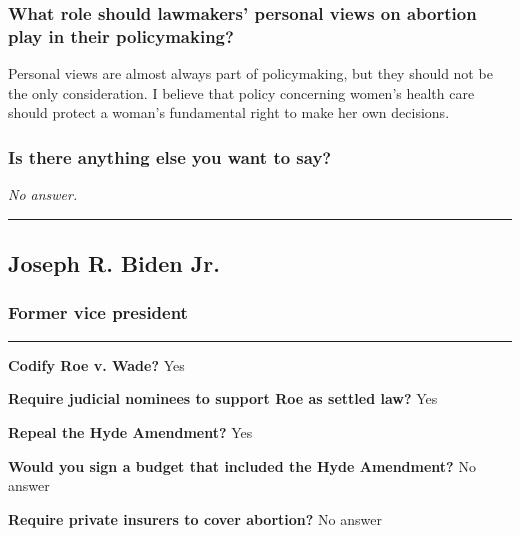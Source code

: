 \hypertarget{what-role-should-lawmakers-personal-views-on-abortion-play-in-their-policymaking}{%
\subsubsection{What role should lawmakers' personal views on abortion
play in their
policymaking?}\label{what-role-should-lawmakers-personal-views-on-abortion-play-in-their-policymaking}}

Personal views are almost always part of policymaking, but they should
not be the only consideration. I believe that policy concerning women's
health care should protect a woman's fundamental right to make her own
decisions.

\hypertarget{is-there-anything-else-you-want-to-say}{%
\subsubsection{Is there anything else you want to
say?}\label{is-there-anything-else-you-want-to-say}}

\emph{No answer.}

\begin{center}\rule{0.5\linewidth}{\linethickness}\end{center}

\hypertarget{joseph-r-biden-jr}{%
\subsection{Joseph R. Biden Jr.}\label{joseph-r-biden-jr}}

\hypertarget{former-vice-president}{%
\subsubsection{Former vice president}\label{former-vice-president}}

\begin{center}\rule{0.5\linewidth}{\linethickness}\end{center}

\textbf{Codify Roe v. Wade?} Yes

\textbf{Require judicial nominees to support Roe as settled law?} Yes

\textbf{Repeal the Hyde Amendment?} Yes

\textbf{Would you sign a budget that included the Hyde Amendment?} No
answer

\textbf{Require private insurers to cover abortion?} No answer

